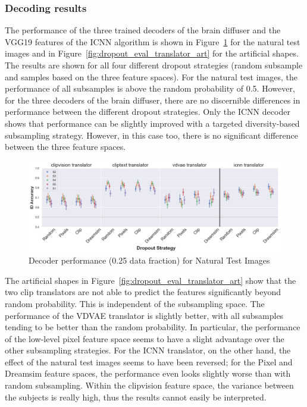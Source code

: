 \subsubsection{Decoding results}
The performance of the three trained decoders of the brain diffuser and the VGG19 features of the ICNN algorithm is shown in Figure~\ref{fig:dropout_eval_translator_test} for the natural test images and in Figure~\ref{fig:dropout_eval_translator_art} for the artificial shapes. The results are shown for all four different dropout strategies (random subsample and samples based on the three feature spaces). For the natural test images, the performance of all subsamples is above the random probability of 0.5. However, for the three decoders of the brain diffuser, there are no discernible differences in performance between the different dropout strategies. Only the ICNN decoder shows that performance can be slightly improved with a targeted diversity-based subsampling strategy. However, in this case too, there is no significant difference between the three feature spaces.

\begin{figure}[ht]
  \centering
  \includegraphics[width=1\textwidth]{plots/dropout_eval_translator_test.png}
  \caption{Decoder performance (0.25 data fraction) for Natural Test Images}\label{fig:dropout_eval_translator_test}
\end{figure}

The artificial shapes in Figure~\ref{fig:dropout_eval_translator_art} show that the two clip translators are not able to predict the features significantly beyond random probability. This is independent of the subsampling space. The performance of the VDVAE translator is slightly better, with all subsamples tending to be better than the random probability. In particular, the performance of the low-level pixel feature space seems to have a slight advantage over the other subsampling strategies. For the ICNN translator, on the other hand, the effect of the natural test images seems to have been reversed; for the Pixel and Dreamsim feature spaces, the performance even looks slightly worse than with random subsampling. Within the clipvision feature space, the variance between the subjects is really high, thus the results cannot easily be interpreted.

